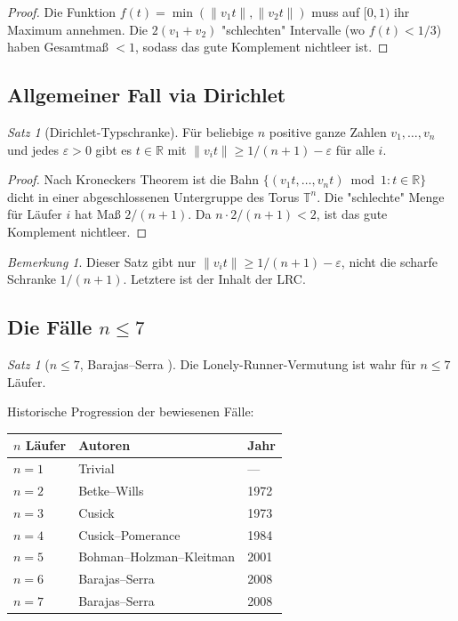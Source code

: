 \documentclass[12pt,a4paper]{amsart}
\theoremstyle{definition}
\theoremstyle{remark}
\newtheorem{satz}[theorem]{Satz}
\newtheorem{bemerkung}[theorem]{Bemerkung}
\newcommand{\R}{\mathbb{R}}
\newcommand{\T}{\mathbb{T}}
\begin{document}
\begin{proof}
Die Funktion $f(t) = \min(\|v_1 t\|, \|v_2 t\|)$ muss auf $[0,1)$ ihr Maximum
annehmen. Die $2(v_1 + v_2)$ "schlechten" Intervalle (wo $f(t) < 1/3$) haben
Gesamtmaß $< 1$, sodass das gute Komplement nichtleer ist.
\end{proof}

\subsection{Allgemeiner Fall via Dirichlet}

\begin{satz}[Dirichlet-Typschranke]\label{satz:dirichlet}
Für beliebige $n$ positive ganze Zahlen $v_1, \ldots, v_n$ und jedes $\varepsilon > 0$
gibt es $t \in \R$ mit $\|v_i t\| \geq 1/(n+1) - \varepsilon$ für alle $i$.
\end{satz}

\begin{proof}
Nach Kroneckers Theorem ist die Bahn $\{(v_1 t, \ldots, v_n t) \bmod 1 : t \in \R\}$
dicht in einer abgeschlossenen Untergruppe des Torus $\T^n$. Die "schlechte" Menge
für Läufer $i$ hat Maß $2/(n+1)$. Da $n \cdot 2/(n+1) < 2$, ist das gute Komplement
nichtleer.
\end{proof}

\begin{bemerkung}
Dieser Satz gibt nur $\|v_i t\| \geq 1/(n+1) - \varepsilon$, nicht die scharfe
Schranke $1/(n+1)$. Letztere ist der Inhalt der LRC.
\end{bemerkung}

\subsection{Die Fälle $n \leq 7$}

\begin{satz}[$n \leq 7$, Barajas--Serra \cite{BarajasSerra2008}]\label{satz:n7}
Die Lonely-Runner-Vermutung ist wahr für $n \leq 7$ Läufer.
\end{satz}

Historische Progression der bewiesenen Fälle:
\begin{center}
\begin{tabular}{lll}
\toprule
\textbf{$n$ Läufer} & \textbf{Autoren} & \textbf{Jahr} \\
\midrule
$n = 1$ & Trivial & --- \\
$n = 2$ & Betke--Wills \cite{BetkeWills1972} & 1972 \\
$n = 3$ & Cusick \cite{Cusick1973} & 1973 \\
$n = 4$ & Cusick--Pomerance \cite{CusickPomerance1984} & 1984 \\
$n = 5$ & Bohman--Holzman--Kleitman \cite{BohmanHolzmanKleitman2001} & 2001 \\
$n = 6$ & Barajas--Serra \cite{BarajasSerra2008} & 2008 \\
$n = 7$ & Barajas--Serra \cite{BarajasSerra2008} & 2008 \\
\bottomrule
\end{tabular}
\end{center}
\end{document}
